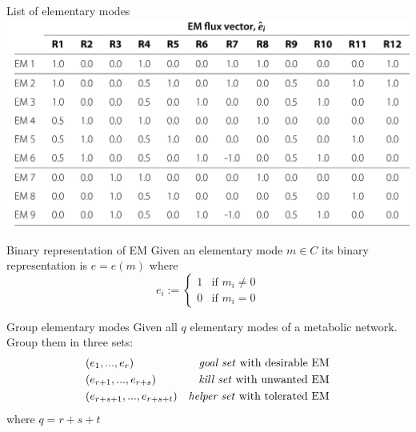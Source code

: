 \documentclass{beamer}
\begin{document}
\begin{frame}{List of elementary modes}
    \includegraphics[width=\textwidth]{grafik/table1a} \\
\end{frame}


\begin{frame}{Binary representation of EM}
    Given an elementary mode $m \in C$ its binary representation is $e = e(m)$ where
    $$
        e_{i} := %
        \begin{cases}
            1 & \text{if }  m_{i} \neq 0 \\
            0 & \text{if }  m_{i} = 0 
        \end{cases}
    $$
\end{frame}


\begin{frame}{Group elementary modes}
    Given all $q$ elementary modes of a metabolic network.
    Group them in three sets:
    \begin{align*}
        & (e_{1}, ..., e_{r})            &\text{\emph{goal set} with desirable EM}   &\\
        & (e_{r+1}, ..., e_{r+s})        &\text{\emph{kill set} with unwanted EM}      &\\
        & (e_{r+s+1}, ..., e_{r+s+t})    &\text{\emph{helper set} with tolerated EM}         &\\
    \end{align*}
where $q = r+s+t$
\end{frame}
\end{document}
